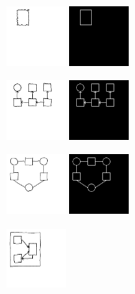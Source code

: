 \documentclass{article}
\begin{document}
\begin{figure}[H]
  \begin{minipage}[t]{2.25cm}
    \includegraphics[width = 2cm]{figures/expert-10.png}
    \includegraphics[width = 2cm]{figures/10-parse.png}    
  \end{minipage}
  \begin{minipage}[t]{2.25cm}
    \includegraphics[width = 2cm]{figures/expert-21.png}
    \includegraphics[width = 2cm]{figures/21-parse.png}    
  \end{minipage}
  \begin{minipage}[t]{2.25cm}
    \includegraphics[width = 2cm]{figures/expert-77.png}
    \includegraphics[width = 2cm]{figures/77-parse.png}    
    \end{minipage}
  \begin{minipage}[t]{2.25cm}
    \includegraphics[width = 2cm]{figures/expert-0.png}

\end{minipage}
\end{figure}
\end{document}
